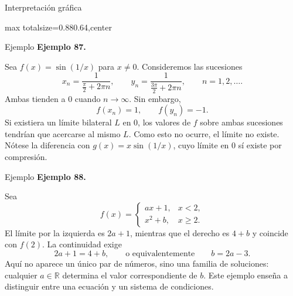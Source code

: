 \documentclass[12pt,aspectratio=169]{beamer}
\newcommand{\R}{\mathbb{R}}
\begin{document}
\begin{frame}[t,allowframebreaks]{Interpretación gráfica}
\begin{center}
\begin{adjustbox}{max totalsize={0.88\linewidth}{0.64\textheight},center}\end{adjustbox}
\end{center}
\end{frame}


\begin{frame}[t,allowframebreaks]{Ejemplo}
{\color{azul}\bfseries Ejemplo 87.}\par\medskip

Sea $f(x)=\sin(1/x)$ para $x\ne0$. Consideremos las sucesiones
\[
x_n=\frac{1}{\frac\pi2+2\pi n},\qquad
y_n=\frac{1}{\frac{3\pi}2+2\pi n},\qquad n=1,2,\ldots.
\]
Ambas tienden a $0$ cuando $n\to\infty$. Sin embargo,
\[
f(x_n)=1,\qquad f(y_n)=-1.
\]
Si existiera un límite bilateral $L$ en $0$, los valores de $f$ sobre ambas sucesiones tendrían que acercarse al mismo $L$. Como esto no ocurre, el límite no existe. Nótese la diferencia con $g(x)=x\sin(1/x)$, cuyo límite en $0$ sí existe por compresión.
\end{frame}


\begin{frame}[t,allowframebreaks]{Ejemplo}
{\color{azul}\bfseries Ejemplo 88.}\par\medskip

Sea
\[
f(x)=\begin{cases}
ax+1,&x<2,\\
x^2+b,&x\ge2.
\end{cases}
\]
El límite por la izquierda es $2a+1$, mientras que el derecho es $4+b$ y coincide con $f(2)$. La continuidad exige
\[
2a+1=4+b,\qquad\text{o equivalentemente}\qquad\boxed{b=2a-3}.
\]
Aquí no aparece un único par de números, sino una familia de soluciones: cualquier $a\in\R$ determina el valor correspondiente de $b$. Este ejemplo enseña a distinguir entre una ecuación y un sistema de condiciones.
\end{frame}
\end{document}
